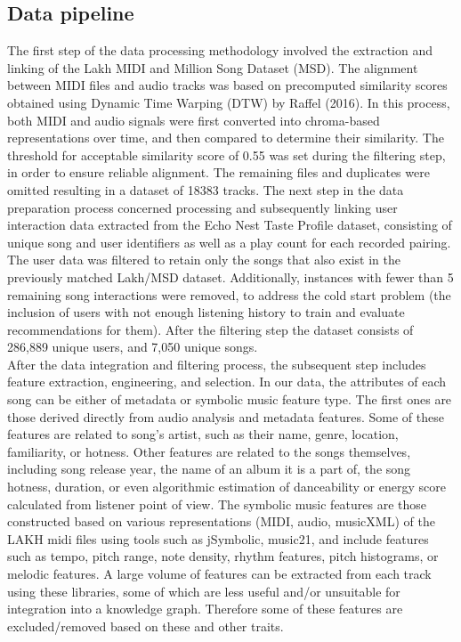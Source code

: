 \documentclass[10pt,twocolumn,letterpaper]{article}
\begin{document}
\subsection{Data pipeline}
The first step of the data processing methodology involved the extraction and linking of the Lakh MIDI and Million Song Dataset (MSD). The alignment between MIDI files and audio tracks was based on precomputed similarity scores obtained using Dynamic Time Warping (DTW) by Raffel (2016). In this process, both MIDI and audio signals were first converted into chroma-based representations over time, and then compared to determine their similarity. The threshold for acceptable similarity score of 0.55 was set during the filtering step, in order to ensure reliable alignment. The remaining files and duplicates were omitted resulting in a dataset of 18383 tracks. 
The next step in the data preparation process concerned processing and subsequently linking user interaction data extracted from the Echo Nest Taste Profile dataset, consisting of unique song and user identifiers as well as a play count for each recorded pairing. The user data was filtered to retain only the songs that also exist in the previously matched Lakh/MSD dataset. Additionally, instances with fewer than 5 remaining song interactions were removed, to address the cold start problem (the inclusion of users with  not enough listening history to train and evaluate recommendations for them). After the filtering step the dataset consists of 286,889 unique users, and 7,050 unique songs.
\\
After the data integration and filtering process, the subsequent step includes feature extraction, engineering, and selection. In our data, the attributes of each song can be either of metadata or symbolic music feature type. The first ones are those derived directly from audio analysis and metadata features. Some of these features are related to song’s artist, such as their name, genre, location, familiarity, or hotness. Other features are related to the songs themselves, including song release year, the name of an album it is a part of, the song hotness, duration, or even algorithmic estimation of danceability or energy score calculated from listener point of view. The symbolic music features are those constructed based on various representations (MIDI, audio, musicXML) of the LAKH midi files using tools such as jSymbolic, music21, and include features such as tempo, pitch range, note density, rhythm features, pitch histograms, or melodic features. A large volume of features can be extracted from each track using these libraries, some of which are less useful and/or unsuitable for integration into a knowledge graph. Therefore some of these features are excluded/removed based on these and other traits.
\end{document}
